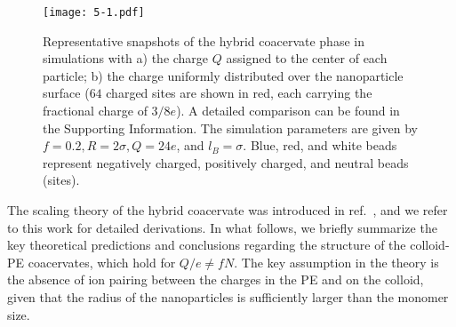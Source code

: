 \documentclass[journal=mamobx, manuscript=article]{achemso}
\begin{document}
\begin{figure}[ht]
\centering
\texttt{[image: 5-1.pdf]}
\caption{ Representative snapshots of the hybrid coacervate phase in simulations with a) the charge $Q$ assigned to the center of each particle; 
b) the charge uniformly distributed over the nanoparticle surface ($64$ charged sites are shown in red, each carrying the fractional charge of $3/8e$). A detailed comparison can be found in the Supporting Information. The simulation parameters are given by $f = 0.2, R = 2\sigma, Q = 24e$, and $l_{B} = \sigma$. Blue, red, and white beads represent negatively charged, positively charged, and neutral beads (sites).}
\label{fig:snapshots-c5}
\end{figure}


The scaling theory of the hybrid coacervate was introduced in ref.~, and we refer to this work for detailed derivations. In what follows, we briefly summarize the key theoretical predictions and conclusions regarding the structure of the colloid-PE coacervates, which hold for $Q/e \neq fN$. The key assumption in the theory is the absence of ion pairing between the charges in the PE and on the colloid, given that the radius of the nanoparticles is sufficiently larger than the monomer size. 
\end{document}
